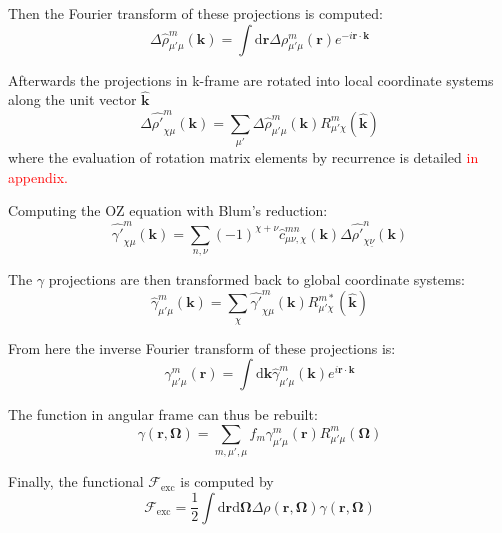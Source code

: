 Then the Fourier transform of these projections is computed:
\begin{equation}
\Delta\hat{\rho}_{\mu'\mu}^{m}(\mathbf{k})=\int\mathrm{d}\mathbf{r}\Delta\rho_{\mu'\mu}^{m}(\mathbf{r})e^{-i\mathbf{r}\cdot\mathbf{k}}\label{eq:fft3d-fwd}
\end{equation}


Afterwards the projections in k-frame are rotated into local coordinate
systems along the unit vector $\mathbf{\hat{k}}$
\begin{equation}
\Delta\hat{\rho'}_{\chi\mu}^{m}(\mathbf{k})=\sum_{\mu'}\Delta\hat{\rho}_{\mu'\mu}^{m}(\mathbf{k})R_{\mu'\chi}^{m}(\mathbf{\hat{k}})
\end{equation}
where the evaluation of rotation matrix elements by recurrence is
detailed \textcolor{red}{in appendix.}

Computing the OZ equation with Blum's reduction:
\begin{equation}
\hat{\gamma'}_{\chi\mu}^{m}(\mathbf{k})=\sum_{n,\nu}(-1)^{\chi+\nu}\hat{c}_{\mu\nu,\chi}^{mn}(\mathbf{k})\Delta\hat{\rho'}_{\chi\underline{\nu}}^{n}(\mathbf{k})\label{eq:OZ-2}
\end{equation}


The $\gamma$ projections are then transformed back to global
coordinate systems:
\begin{equation}
\hat{\gamma}_{\mu'\mu}^{m}(\mathbf{k})=\sum_{\chi}\hat{\gamma'}_{\chi\mu}^{m}(\mathbf{k})R_{\mu'\chi}^{m*}(\mathbf{\hat{k}})
\end{equation}


From here the inverse Fourier transform of these projections is:
\begin{equation}
\gamma_{\mu'\mu}^{m}(\mathbf{r})=\int\mathrm{d}\mathbf{k}\hat{\gamma}_{\mu'\mu}^{m}(\mathbf{k})e^{i\mathbf{r}\cdot\mathbf{k}}
\end{equation}


The function in angular frame can thus be rebuilt:
\begin{equation}
\gamma(\mathbf{r},\mathbf{\Omega})=\sum_{m,\mu',\mu}f_{m}\gamma_{\mu'\mu}^{m}(\mathbf{r})R_{\mu'\mu}^{m}(\mathbf{\Omega})\label{eq:fgsht-bwd}
\end{equation}


Finally, the functional $\mathcal{F}_{\mathrm{exc}}$ is computed
by
\begin{equation}
\mathcal{F}_{\mathrm{exc}}=\frac{1}{2}\int\mathrm{d}\mathbf{r}\mathrm{d}\mathbf{\Omega}\Delta\rho(\mathbf{r},\mathbf{\Omega})\gamma(\mathbf{r},\mathbf{\Omega})
\end{equation}



